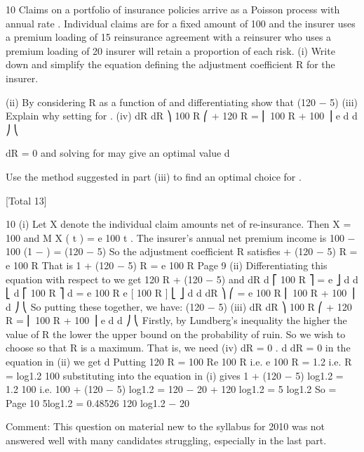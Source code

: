 \documentclass[a4paper,12pt]{article}
\begin{document}
 




10
Claims on a portfolio of insurance policies arrive as a Poisson process with annual
rate \lambda. Individual claims are for a fixed amount of 100 and the insurer uses a
premium loading of 15%
reinsurance agreement with a reinsurer who uses a premium loading of 20%
insurer will retain a proportion \alpha of each risk.
(i) Write down and simplify the equation defining the adjustment coefficient R
for the insurer.

(ii) By considering R as a function of \alpha and differentiating show that
(120 \alpha − 5)
(iii)
Explain why setting
for \alpha .
(iv)
dR
dR ⎞ 100 \alpha R
⎛
+ 120 R = ⎜ 100 R + 100 \alpha
⎟ e
d \alpha
d \alpha ⎠
⎝

dR
= 0 and solving for \alpha may give an optimal value
d\alpha

Use the method suggested in part (iii) to find an optimal choice for \alpha .

[Total 13]

10
(i)
Let X denote the individual claim amounts net of re-insurance. Then
X = 100 \alpha and M X ( t ) = e 100 \alpha t .
The insurer’s annual net premium income is
100 \times \lambda {} − 100 \times (1 − \alpha ) \times \lambda {} = \lambda (120 \alpha − 5)
So the adjustment coefficient R satisfies
\lambda + \lambda (120 \alpha − 5) R = \lambda e 100 \alpha R
That is 1 + (120 \alpha − 5) R = e 100 \alpha R
Page 9%
(ii)
Differentiating this equation with respect to \alpha we get
120 R + (120 \alpha − 5)
and
dR
d ⎡ 100 \alpha R ⎤
=
e
⎦
d \alpha d \alpha ⎣
d ⎡ 100 \alpha R ⎤
d
= e 100 \alpha R
e
[ 100 \alpha R ]
⎣
⎦
d \alpha
d \alpha
dR ⎞
⎛
= e 100 \alpha R ⎜ 100 R + 100 \alpha
⎟
d \alpha ⎠
⎝
So putting these together, we have:
(120 \alpha − 5)
(iii)
dR
dR ⎞ 100 \alpha R
⎛
+ 120 R = ⎜ 100 R + 100 \alpha
⎟ e
d \alpha
d \alpha ⎠
⎝
Firstly, by Lundberg’s inequality the higher the value of R the lower the upper
bound on the probability of ruin.
So we wish to choose \alpha so that R is a maximum.
That is, we need
(iv)
dR
= 0 .
d \alpha
dR
= 0 in the equation in (ii) we get
d \alpha
Putting
120 R = 100 Re 100 \alpha R
i.e. e 100 \alpha R = 1.2
i.e. R =
log1.2
100 \alpha
substituting into the equation in (i) gives
1 + (120 \alpha − 5) \times
log1.2
= 1.2
100 \alpha
i.e. 100 \alpha + (120 \alpha − 5) log1.2 = 120 \alpha
− 20 \alpha + 120 \alpha log1.2 = 5 log1.2
So \alpha =
Page 10
5log1.2
= 0.48526
120 log1.2 − 20

Comment: This question on material new to the syllabus for 2010 was not answered well
with many candidates struggling, especially in the last part.
\end{document}
